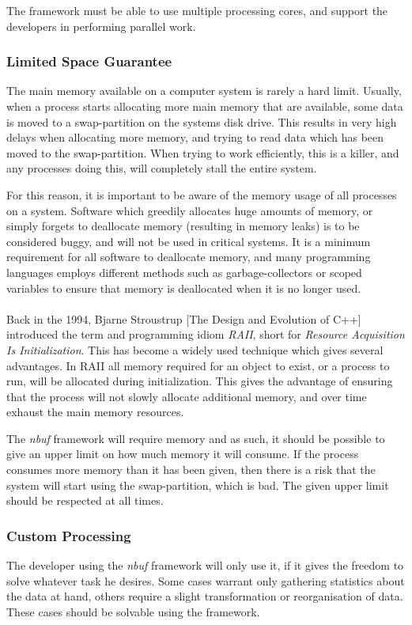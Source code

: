 \documentclass[a4paper]{article}
\newcommand{\nbuf}{\textit{nbuf} }
\begin{document}
The framework must be able to use multiple processing cores, and support the developers in performing parallel work.


\subsubsection{Limited Space Guarantee}
The main memory available on a computer system is rarely a hard limit. Usually, when a process starts allocating more main memory that are available, some data is moved to a swap-partition on the systems disk drive. This results in very high delays when allocating more memory, and trying to read data which has been moved to the swap-partition. When trying to work efficiently, this is a killer, and any processes doing this, will completely stall the entire system. 

For this reason, it is important to be aware of the memory usage of all processes on a system. Software which greedily allocates huge amounts of memory, or simply forgets to deallocate memory (resulting in memory leaks) is to be considered buggy, and will not be used in critical systems. It is a minimum requirement for all software to deallocate memory, and many programming languages employs different methods such as garbage-collectors or scoped variables to ensure that memory is deallocated when it is no longer used.\\\\


Back in the 1994, Bjarne Stroustrup [The Design and Evolution of C++] introduced the term and programming idiom \textit{RAII}, short for \textit{Resource Acquisition Is Initialization}. This has become a widely used technique which gives several advantages. In RAII all memory required for an object to exist, or a process to run, will be allocated during initialization. This gives the advantage of ensuring that the process will not slowly allocate additional memory, and over time exhaust the main memory resources.

The \nbuf framework will require memory and as such, it should be possible to give an upper limit on how much memory it will consume. If the process consumes more memory than it has been given, then there is a risk that the system will start using the swap-partition, which is bad. The given upper limit should be respected at all times.


\subsubsection{Custom Processing}
The developer using the \nbuf framework will only use it, if it gives the freedom to solve whatever task he desires. Some cases warrant only gathering statistics about the data at hand, others require a slight transformation or reorganisation of data. These cases should be solvable using the framework. 
\end{document}
